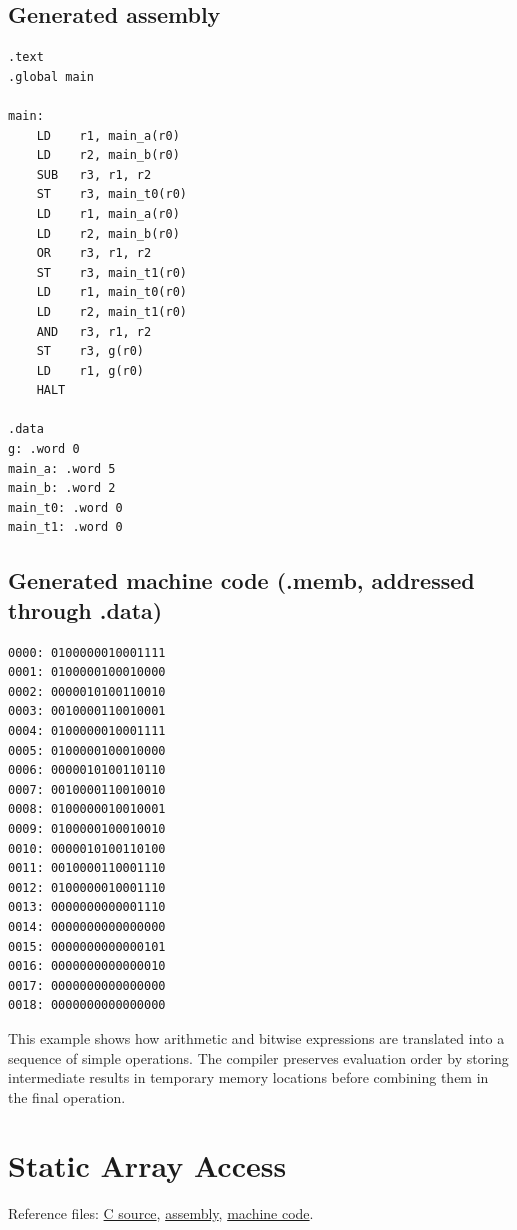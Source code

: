 \documentclass[12pt]{report}
\begin{document}
\subsection*{Generated assembly}
\begin{lstlisting}[language=CustomISAAsm]
.text
.global main

main:
    LD    r1, main_a(r0)
    LD    r2, main_b(r0)
    SUB   r3, r1, r2
    ST    r3, main_t0(r0)
    LD    r1, main_a(r0)
    LD    r2, main_b(r0)
    OR    r3, r1, r2
    ST    r3, main_t1(r0)
    LD    r1, main_t0(r0)
    LD    r2, main_t1(r0)
    AND   r3, r1, r2
    ST    r3, g(r0)
    LD    r1, g(r0)
    HALT

.data
g: .word 0
main_a: .word 5
main_b: .word 2
main_t0: .word 0
main_t1: .word 0
\end{lstlisting}

\subsection*{Generated machine code (.memb, addressed through .data)}
\begin{lstlisting}
0000: 0100000010001111
0001: 0100000100010000
0002: 0000010100110010
0003: 0010000110010001
0004: 0100000010001111
0005: 0100000100010000
0006: 0000010100110110
0007: 0010000110010010
0008: 0100000010010001
0009: 0100000100010010
0010: 0000010100110100
0011: 0010000110001110
0012: 0100000010001110
0013: 0000000000001110
0014: 0000000000000000
0015: 0000000000000101
0016: 0000000000000010
0017: 0000000000000000
0018: 0000000000000000
\end{lstlisting}

This example shows how arithmetic and bitwise expressions are translated into a sequence of simple operations. The compiler preserves evaluation order by storing intermediate results in temporary memory locations before combining them in the final operation.

\section{Static Array Access}
Reference files:
\href{https://github.com/shorewind/Custom-ISA-Toolchain/blob/main/tests/feature-check/arrays/array-static.c}{C source},
\href{https://github.com/shorewind/Custom-ISA-Toolchain/blob/main/tests/feature-check/arrays/array-static.s}{assembly},
\href{https://github.com/shorewind/Custom-ISA-Toolchain/blob/main/tests/feature-check/arrays/array-static.memb}{machine code}.
\end{document}
